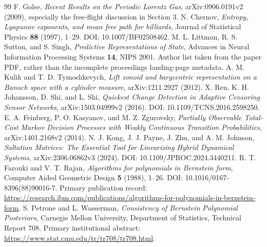 \begin{thebibliography}{99}
 F. Golse, \emph{Recent Results on the Periodic Lorentz Gas},
arXiv:0906.0191v2 (2009), especially the free-flight discussion in Section 3.
 N. Chernov, \emph{Entropy, Lyapunov exponents, and mean free
path for billiards}, Journal of Statistical Physics \textbf{88} (1997),
1--29. DOI: 10.1007/BF02508462.
 M. L. Littman, R. S. Sutton, and S. Singh,
\emph{Predictive Representations of State}, Advances in Neural Information
Processing Systems \textbf{14}, NIPS 2001. Author list taken from the paper
PDF, rather than the incomplete proceedings landing-page metadata.
 A. M. Kulik and T. D. Tymoshkevych,
\emph{Lift zonoid and barycentric representation on a Banach space with a
cylinder measure}, arXiv:1211.2927 (2012).
 X. Ren, K. H. Johansson, D. Shi, and L. Shi,
\emph{Quickest Change Detection in Adaptive Censoring Sensor Networks},
arXiv:1503.04999v2 (2016). DOI: 10.1109/TCNS.2016.2598250.
 E. A. Feinberg, P. O. Kasyanov, and M. Z. Zgurovsky,
\emph{Partially Observable Total-Cost Markov Decision Processes with Weakly
Continuous Transition Probabilities}, arXiv:1401.2168v2 (2014).
 N. J. Kong, J. J. Payne, J. Zhu, and A. M. Johnson,
\emph{Saltation Matrices: The Essential Tool for Linearizing Hybrid Dynamical
Systems}, arXiv:2306.06862v3 (2024). DOI: 10.1109/JPROC.2024.3440211.
 R. T. Farouki and V. T. Rajan,
\emph{Algorithms for polynomials in Bernstein form}, Computer Aided Geometric
Design \textbf{5} (1988), 1--26. DOI: 10.1016/0167-8396(88)90016-7.
Primary publication record: \url{https://research.ibm.com/publications/algorithms-for-polynomials-in-bernstein-form}.
 S. Petrone and L. Wasserman,
\emph{Consistency of Bernstein Polynomial Posteriors}, Carnegie Mellon
University, Department of Statistics, Technical Report 708.
Primary institutional abstract: \url{https://www.stat.cmu.edu/tr/tr708/tr708.html}.
\end{thebibliography}
